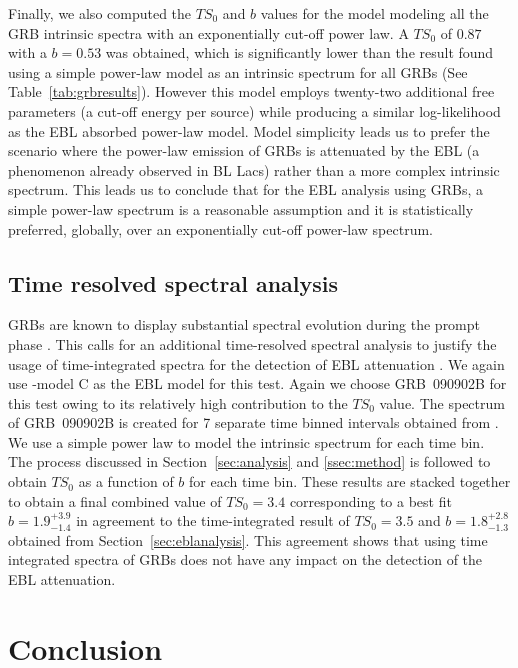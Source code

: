 \documentclass[12pt,preprint]{aastex}
\begin{document}
 {Finally, we also computed the $TS_0$ and $b$ values 
for the \cite{finke10} model 
modeling all the GRB  intrinsic spectra with an exponentially cut-off
power law.
A $TS_0$ of $0.87$ with a $b=0.53$ was obtained, which is significantly lower 
than the result found using a simple power-law model as an
intrinsic spectrum for all GRBs (See Table~\ref{tab:grbresults}). 
However this model employs {twenty-two} additional free parameters (a
cut-off energy per source) while producing a similar log-likelihood as
the EBL absorbed power-law model. {Model simplicity leads us to
  prefer the scenario where the power-law emission of GRBs is attenuated by
  the EBL (a phenomenon already observed in BL Lacs) rather than a
  more complex intrinsic spectrum.} This leads us to
conclude that for the EBL analysis using GRBs, a simple power-law
spectrum is { a reasonable assumption and it is statistically
  preferred, globally, over an exponentially cut-off power-law spectrum.}

\subsection{Time resolved spectral analysis}
\label{ssec:expcutoff}

GRBs are known to display substantial spectral evolution during the prompt phase
\citep[][]{zhang11,1FHL}.
This calls for an additional time-resolved spectral analysis to justify the
usage of time-integrated spectra for the detection of EBL attenuation \citep{guiriec17}. 
We again use \cite{finke10}-model C as the EBL model
for this test.
 {Again} we choose GRB~090902B for this test owing to its relatively high contribution to the
$TS_0$ value. 
The spectrum of GRB~090902B is created for 7 separate time binned
intervals obtained from \cite{090902}. We use a simple power law to model the intrinsic spectrum 
for each time bin.
The process discussed in Section~\ref{sec:analysis} and \ref{ssec:method} is 
followed to obtain $TS_0$ as a function of $b$ for each time bin.
These results are stacked together to obtain a final combined value of $TS_0= 3.4$
corresponding {to} a best fit {$b=1.9^{+3.9}_{-1.4}$ }in agreement to the time-integrated result of $TS_0= 3.5$ and $b=1.8^{+2.8}_{-1.3}$
obtained from Section~\ref{sec:eblanalysis}.
This agreement shows that using time integrated spectra of GRBs does
not have any impact on the detection of the EBL attenuation.



\section{Conclusion}
\label{sec:discussion}


}
\end{document}
